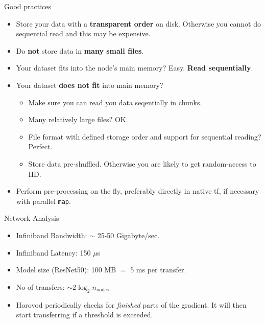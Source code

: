 \documentclass[t, 10pt, aspectratio=1610]{beamer}
\begin{document}
\begin{frame}{Good practices}
    \begin{itemize}
        \item Store your data with a \textbf{transparent order} on disk. Otherwise you cannot do sequential read and this may be expensive.
        \item Do \textbf{not} store data in \textbf{many small files}. 
        \item Your dataset fits into the node's main memory? Easy. \textbf{Read sequentially}.
        \item Your dataset \textbf{does not fit} into main memory?
        \begin{itemize}
            \item Make sure you can read you data seqentially in chunks.
            \item Many relatively large files? OK. 
            \item File format with defined storage order and support for sequential reading? Perfect.
            \item Store data pre-shuffled. Otherwise you are likely to get random-access to HD.
        \end{itemize}
        \item Perform pre-processing on the fly, preferably directly in native tf, if necessary with parallel \texttt{map}.
    \end{itemize}
\end{frame}


\begin{frame}{Network Analysis}
\begin{itemize}
    \item Infiniband Bandwidth: $\sim$ 25-50 Gigabyte/sec.
    \item Infiniband Latency: 150 $\mu$s
    \item Model size (ResNet50): 100 MB $=$ 5 ms per transfer.
    \item No of transfers: $\sim 2 \log_2 n_\text{nodes}$
    \item Horovod periodically checks for \emph{finished} parts of the gradient. It will then start transferring if a threshold is exceeded.
\end{itemize}



    
\end{frame}
\end{document}
